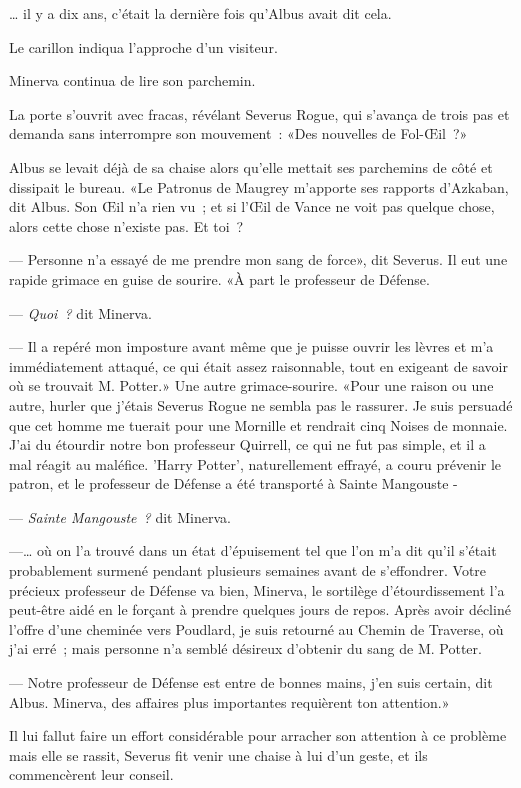 … il y a dix ans, c'était la dernière fois qu'Albus avait dit cela.

Le carillon indiqua l'approche d'un visiteur.

Minerva continua de lire son parchemin.

La porte s'ouvrit avec fracas, révélant Severus Rogue, qui s'avança de trois pas et demanda sans interrompre son mouvement~: «Des nouvelles de Fol-Œil~?»

Albus se levait déjà de sa chaise alors qu'elle mettait ses parchemins de côté et dissipait le bureau. «Le Patronus de Maugrey m'apporte ses rapports d'Azkaban, dit Albus. Son Œil n'a rien vu~; et si l'Œil de Vance ne voit pas quelque chose, alors cette chose n'existe pas. Et toi~?

--- Personne n'a essayé de me prendre mon sang de force», dit Severus. Il eut une rapide grimace en guise de sourire. «À part le professeur de Défense.

--- \emph{Quoi~?} dit Minerva.

--- Il a repéré mon imposture avant même que je puisse ouvrir les lèvres et m'a immédiatement attaqué, ce qui était assez raisonnable, tout en exigeant de savoir où se trouvait M. Potter.» Une autre grimace-sourire. «Pour une raison ou une autre, hurler que j'étais Severus Rogue ne sembla pas le rassurer. Je suis persuadé que cet homme me tuerait pour une Mornille et rendrait cinq Noises de monnaie. J'ai du étourdir notre bon professeur Quirrell, ce qui ne fut pas simple, et il a mal réagit au maléfice. 'Harry Potter', naturellement effrayé, a couru prévenir le patron, et le professeur de Défense a été transporté à Sainte Mangouste -

--- \emph{Sainte Mangouste~?} dit Minerva.

---… où on l'a trouvé dans un état d'épuisement tel que l'on m'a dit qu'il s'était probablement surmené pendant plusieurs semaines avant de s'effondrer. Votre précieux professeur de Défense va bien, Minerva, le sortilège d'étourdissement l'a peut-être aidé en le forçant à prendre quelques jours de repos. Après avoir décliné l'offre d'une cheminée vers Poudlard, je suis retourné au Chemin de Traverse, où j'ai erré~; mais personne n'a semblé désireux d'obtenir du sang de M. Potter.

--- Notre professeur de Défense est entre de bonnes mains, j'en suis certain, dit Albus. Minerva, des affaires plus importantes requièrent ton attention.»

Il lui fallut faire un effort considérable pour arracher son attention à ce problème mais elle se rassit, Severus fit venir une chaise à lui d'un geste, et ils commencèrent leur conseil.

